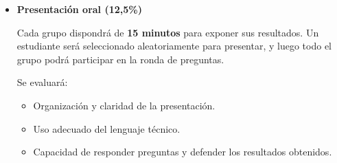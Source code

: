 \documentclass[a4paper,12pt]{article}
\begin{document}
\begin{itemize}
\begin{itemize}
\begin{itemize}
            \item \textbf{Homoscedasticidad} (Breusch-Pagan, White)
            
            \item \textbf{Normalidad de los errores}
                      \item \textbf{Multicolinealidad} (Factor de Inflación de la Varianza - VIF):
           
        \end{itemize}

        Si se detectan problemas en los supuestos, se deben proponer y aplicar correcciones.
          \item \textbf{Testear hipótesis de la investigación }:

        \item \textbf{Conclusiones y recomendaciones}:
        \begin{itemize}
            \item Resumen de los principales hallazgos del análisis.
            \item Evaluación de si las hipótesis fueron confirmadas o rechazadas.
            \item Limitaciones del modelo y propuestas de mejoras.
        \end{itemize}
    \end{itemize}

    \item \textbf{Presentación oral (12,5\%)}

    Cada grupo dispondrá de \textbf{15 minutos} para exponer sus resultados. Un estudiante será seleccionado aleatoriamente para presentar, y luego todo el grupo podrá participar en la ronda de preguntas.

    Se evaluará:
    \begin{itemize}
        \item Organización y claridad de la presentación.
        \item Uso adecuado del lenguaje técnico.
        \item Capacidad de responder preguntas y defender los resultados obtenidos.
    \end{itemize}
\end{itemize}
\end{document}
